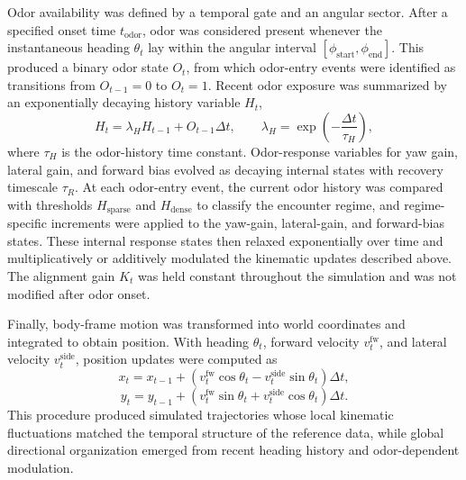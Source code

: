 Odor availability was defined by a temporal gate and an angular sector. After a specified onset time \(t_{\mathrm{odor}}\), odor was considered present whenever the instantaneous heading \(\theta_t\) lay within the angular interval \([\phi_{\mathrm{start}},\phi_{\mathrm{end}}]\). This produced a binary odor state \(O_t\), from which odor-entry events were identified as transitions from \(O_{t-1}=0\) to \(O_t=1\). Recent odor exposure was summarized by an exponentially decaying history variable \(H_t\),
\[
H_t = \lambda_H H_{t-1} + O_{t-1}\Delta t,
\qquad
\lambda_H = \exp\!\left(-\frac{\Delta t}{\tau_H}\right),
\]
where \(\tau_H\) is the odor-history time constant. Odor-response variables for yaw gain, lateral gain, and forward bias evolved as decaying internal states with recovery timescale \(\tau_R\). At each odor-entry event, the current odor history was compared with thresholds \(H_{\mathrm{sparse}}\) and \(H_{\mathrm{dense}}\) to classify the encounter regime, and regime-specific increments were applied to the yaw-gain, lateral-gain, and forward-bias states. These internal response states then relaxed exponentially over time and multiplicatively or additively modulated the kinematic updates described above. The alignment gain \(K_t\) was held constant throughout the simulation and was not modified after odor onset.

Finally, body-frame motion was transformed into world coordinates and integrated to obtain position. With heading \(\theta_t\), forward velocity \(v^{\mathrm{fw}}_t\), and lateral velocity \(v^{\mathrm{side}}_t\), position updates were computed as
\[
x_t = x_{t-1} + \left(v^{\mathrm{fw}}_t\cos\theta_t - v^{\mathrm{side}}_t\sin\theta_t\right)\Delta t,
\]
\[
y_t = y_{t-1} + \left(v^{\mathrm{fw}}_t\sin\theta_t + v^{\mathrm{side}}_t\cos\theta_t\right)\Delta t.
\]
This procedure produced simulated trajectories whose local kinematic fluctuations matched the temporal structure of the reference data, while global directional organization emerged from recent heading history and odor-dependent modulation.
